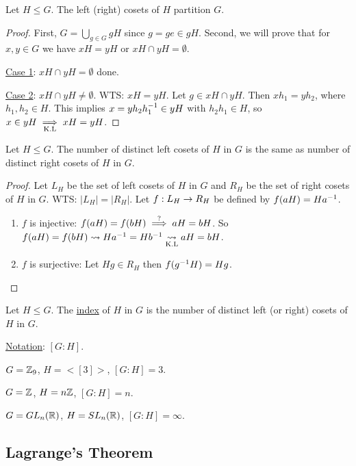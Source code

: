 \documentclass[]{article}
\begin{document}
\begin{theorem}
	Let $H\leq G$. The left (right) cosets of $H$ partition $G$.
\end{theorem}
\begin{proof}
	First, $G = \bigcup_{g\in G} gH$ since $g = ge\in gH$.
	Second, we will prove that for $x,y\in G$ we have $xH = yH$ or $xH\cap yH = \emptyset$.
	
	\ul{Case 1}: $xH\cap yH = \emptyset$ done.

	\ul{Case 2}: $xH\cap yH \neq \emptyset$. WTS: $xH = yH$.
	Let $g\in xH\cap yH$. Then $xh_1 = yh_2$, where $h_1,h_2\in H$.
	This implies $x = y h_2 h_1^{-1}\in yH$ with $h_2 h_1\in H$, so $x\in yH \underset{\text{K.L}}{\implies} xH = yH$.
\end{proof}

\begin{theorem}
	Let $H\leq G$. The number of distinct left cosets of $H$ in $G$ is the same as number of distinct right cosets of $H$ in $G$.
\end{theorem}
\begin{proof}
	Let $L_H$ be the set of left cosets of $H$ in $G$ and $R_H$ be the set of right cosets of $H$ in $G$.
	WTS: $|L_H| = |R_H|$.
	Let $f: L_H\rightarrow R_H$ be defined by $f(aH) = Ha^{-1}$.
	\begin{enumerate}
		\item $f$ is injective: $f(aH) = f(bH) \overset{?}{\implies} aH = bH$. So $f(aH) = f(bH) \rightsquigarrow Ha^{-1} = Hb^{-1} \underset{\text{K.L}}{\rightsquigarrow} aH = bH$.
		\item $f$ is surjective: Let $Hg\in R_H$ then $f(g^{-1} H) = Hg$.
	\end{enumerate}
\end{proof}

\begin{definition}
	Let $H\leq G$. The \ul{index} of $H$ in $G$ is the number of distinct left (or right) cosets of $H$ in $G$.
\end{definition}
\ul{Notation}: $[G:H]$.
\begin{example}
	$G = \mathbb{Z}_9$, $H = <[3]>$, $[G:H] = 3$.
\end{example}
\begin{example}
	$G = \mathbb{Z}$, $H = n\mathbb{Z}$, $[G:H] = n$.
\end{example}
\begin{example}
	$G = GL_n(\mathbb{R})$, $H = SL_n(\mathbb{R})$, $[G:H] = \infty$.
\end{example}

\subsection{Lagrange's Theorem}
\end{document}
